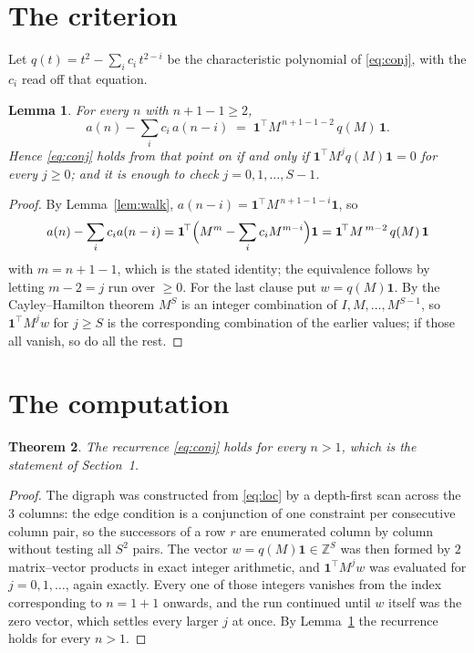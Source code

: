 \documentclass[11pt,a4paper]{article}
\theoremstyle{plain}
\newtheorem{theorem}{Theorem}
\newtheorem{lemma}[theorem]{Lemma}
\theoremstyle{definition}
\begin{document}
\section{The criterion}

Let $q(t)=t^{2}-\sum_i c_i\,t^{2-i}$ be the characteristic polynomial of
\eqref{eq:conj}, with the $c_i$ read off that equation.

\begin{lemma}\label{lem:crit}
For every $n$ with $n+1-1\ge2$,
\[
a(n)-\sum_i c_i\,a(n-i)\;=\;\mathbf{1}^{\!\top}M^{\,n+1-1-2}\,q(M)\,\mathbf{1} .
\]
Hence \eqref{eq:conj} holds from that point on if and only if
$\mathbf{1}^{\!\top}M^{j}q(M)\mathbf{1}=0$ for every $j\ge0$; and it is enough to check
$j=0,1,\dots,S-1$.
\end{lemma}

\begin{proof}
By Lemma~\ref{lem:walk}, $a(n-i)=\mathbf{1}^{\!\top}M^{\,n+1-1-i}\mathbf{1}$, so
\[
a(n)-\sum_i c_i a(n-i)
=\mathbf{1}^{\!\top}\Bigl(M^{m}-\sum_i c_i M^{m-i}\Bigr)\mathbf{1}
=\mathbf{1}^{\!\top}M^{\,m-2}\,q(M)\,\mathbf{1}
\]
with $m=n+1-1$, which is the stated identity; the equivalence follows by letting
$m-2=j$ run over $\ge0$. For the last clause put $w=q(M)\mathbf{1}$. By the
Cayley--Hamilton theorem $M^{S}$ is an integer combination of $I,M,\dots,M^{S-1}$, so
$\mathbf{1}^{\!\top}M^{j}w$ for $j\ge S$ is the corresponding combination of the earlier
values; if those all vanish, so do all the rest.
\end{proof}

\section{The computation}

\begin{theorem}
The recurrence \eqref{eq:conj} holds for every $n>1$, which is the statement of
Section~1.
\end{theorem}

\begin{proof}
The digraph was constructed from \eqref{eq:loc} by a depth-first scan across the $3$
columns: the edge condition is a conjunction of one constraint per consecutive column
pair, so the successors of a row $r$ are enumerated column by column without testing all
$S^2$ pairs. The vector $w=q(M)\mathbf{1}\in\mathbb{Z}^{S}$ was then formed by $2$
matrix--vector products in exact integer arithmetic, and $\mathbf{1}^{\!\top}M^{j}w$ was
evaluated for $j=0,1,\dots$, again exactly. Every one of those integers vanishes from the
index corresponding to $n=1+1$ onwards, and the run continued until $w$ itself was the
zero vector, which settles every larger $j$ at once. By Lemma~\ref{lem:crit} the recurrence
holds for every $n>1$.
\end{proof}
\end{document}

